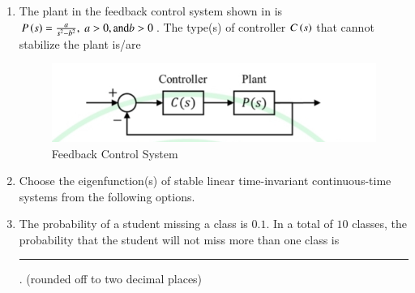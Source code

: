 \documentclass[journal,12pt,onecolumn]{IEEEtran}
\theoremstyle{remark}
\begin{document}
\begin{enumerate}
\item The plant in the feedback control system shown in  is $P\left(s\right)=\frac{a}{s^2-b^2},\; a>0,\text{and} b>0$. The type(s) of controller $C\left(s\right)$ that cannot stabilize the plant is/are \par\hfill{}
\begin{figure}[H]
    \centering
    \includegraphics[width=0.6\columnwidth]{Figs/Q-50.jpg}
    \caption{Feedback Control System}
    \label{50}
\end{figure}
\begin{enumerate}
\end{enumerate}


\item Choose the eigenfunction(s) of stable linear time-invariant continuous-time systems from the following options. \par\hfill{}
\begin{enumerate}
\end{enumerate}


\item The probability of a student missing a class is $0.1$. In a total of $10$ classes, the probability that the student will not miss more than one class is \rule{1.5cm}{0.4pt}. (rounded off to two decimal places) \par\hfill{}



\end{enumerate}
\end{document}
